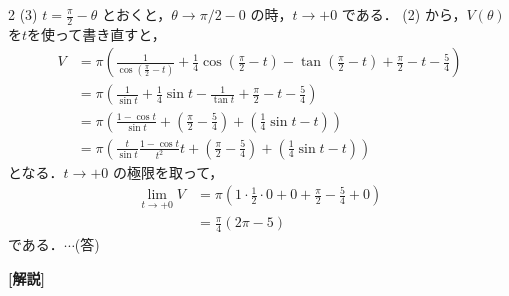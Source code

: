 \documentclass[../../../../main.tex]{subfiles}
\begin{document}
\begin{multicols}{2}
    \vspace{10pt}
    (3)
    $t=\frac{\pi}{2}-\theta$ とおくと，$\theta \to \pi/2-0$ の時，$t \to +0$ である．
    (2) から，$V(\theta)$を$t$を使って書き直すと，
    \begin{align*}
        V
         & = \pi \left( \frac{1}{\cos\left(\frac{\pi}{2}-t\right)} + \frac{1}{4}\cos\left(\frac{\pi}{2}-t\right) - \tan\left(\frac{\pi}{2}-t\right) + \frac{\pi}{2}-t - \frac{5}{4} \right) \\
         & = \pi \left( \frac{1}{\sin t} + \frac{1}{4}\sin t - \frac{1}{\tan t} + \frac{\pi}{2}-t - \frac{5}{4} \right)                                                                     \\
         & = \pi \left( \frac{1-\cos t}{\sin t} + \left(\frac{\pi}{2}-\frac{5}{4}\right) + \left(\frac{1}{4}\sin t - t\right) \right)                                                       \\
         & = \pi \left( \frac{t}{\sin t} \frac{1-\cos t}{t^2} t + \left(\frac{\pi}{2}-\frac{5}{4}\right) + \left(\frac{1}{4}\sin t - t\right) \right)
    \end{align*}
    となる．$t \to +0$ の極限を取って，
    \begin{align*}
        \lim_{t \to +0} V
         & = \pi \left( 1 \cdot \frac{1}{2} \cdot 0 + 0 + \frac{\pi}{2}-\frac{5}{4} + 0 \right) \\
         & = \frac{\pi}{4}\left(2\pi-5\right)
    \end{align*}
    である．$\cdots$(答)

    \vspace{10pt}
    {\bf[解説]}

    \newpage
\end{multicols}
\end{document}
